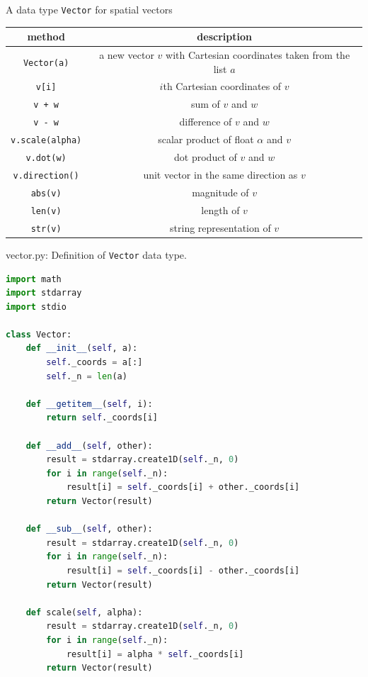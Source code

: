 \documentclass[8pt,a4paper,compress]{beamer}
\begin{document}
\begin{frame}[fragile]
\pause

A data type \lstinline{Vector} for spatial vectors
\begin{center}
\begin{tabular}{cc}
method & description \\ \hline
\lstinline$Vector(a)$ & a new vector $v$ with Cartesian coordinates taken from the list $a$ \\
\lstinline$v[i]$ & $i$th Cartesian coordinates of $v$ \\
\lstinline$v + w$ & sum of $v$ and $w$ \\
\lstinline$v - w$ & difference of $v$ and $w$ \\
\lstinline$v.scale(alpha)$ & scalar product of float $\alpha$ and $v$ \\
\lstinline$v.dot(w)$ & dot product of $v$ and $w$ \\
\lstinline$v.direction()$ & unit vector in the same direction as $v$ \\
\lstinline$abs(v)$ & magnitude of $v$ \\
\lstinline$len(v)$ & length of $v$ \\
\lstinline$str(v)$ & string representation of $v$
\end{tabular} 
\end{center}
\end{frame}

\begin{frame}[fragile]
\pause

\begin{framed}
\tiny vector.py: Definition of \lstinline{Vector} data type.
\end{framed}

\begin{lstlisting}[language=Python,style=focusin]
import math
import stdarray
import stdio

class Vector:
    def __init__(self, a):
        self._coords = a[:]
        self._n = len(a)

    def __getitem__(self, i):
        return self._coords[i]

    def __add__(self, other):
        result = stdarray.create1D(self._n, 0)
        for i in range(self._n):
            result[i] = self._coords[i] + other._coords[i]
        return Vector(result)

    def __sub__(self, other):
        result = stdarray.create1D(self._n, 0)
        for i in range(self._n):
            result[i] = self._coords[i] - other._coords[i]
        return Vector(result)

    def scale(self, alpha):
        result = stdarray.create1D(self._n, 0)
        for i in range(self._n):
            result[i] = alpha * self._coords[i]
        return Vector(result)
\end{lstlisting}
\end{frame}
\end{document}
